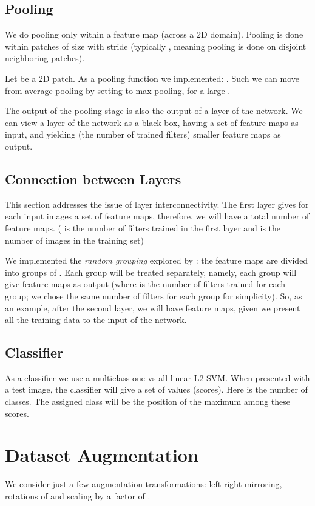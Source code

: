 \documentclass[runningheads]{llncs}
\begin{document}
\subsection{Pooling}
We do pooling only within a feature map (across a 2D domain). Pooling is done within patches of size  with stride  (typically , meaning pooling is done on disjoint neighboring patches).

Let  be a 2D patch. As a pooling function we implemented: . Such we can move from average pooling by setting  to max pooling, for a large . 


The output of the pooling stage is also the output of a layer of the network. We can view a layer of the network as a black box, having a set of feature maps as input, and yielding  (the number of trained filters) smaller feature maps as output.

\subsection{Connection between Layers}
This section addresses the issue of layer interconnectivity. The first layer gives for each input images a set of  feature maps, therefore, we will have a total number of  feature maps. ( is the number of filters trained in the first layer and  is the number of images in the training set)

We implemented the \textit{random grouping} explored by \cite{DBLP:journals/corr/CulurcielloJDB13}: the  feature maps are divided into  groups of . Each group will be treated separately, namely, each group will give  feature maps as output (where  is the number of filters trained for each group; we chose the same number of filters for each group for simplicity). So, as an example, after the second layer, we will have  feature maps, given we present all the training data to the input of the network.

\subsection{Classifier}
As a classifier we use a multiclass one-vs-all linear L2 SVM.
When presented with a test image, the classifier will give a set of  values (scores). Here  is the number of classes. The assigned class will be the position of the maximum among these scores.

\section{Dataset Augmentation}
We consider just a few augmentation transformations: left-right mirroring, rotations of  and scaling by a factor of .
\end{document}
